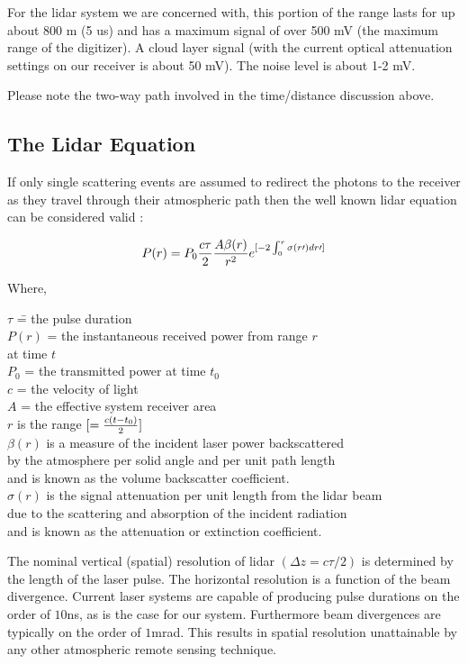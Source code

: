 For the lidar system we are concerned with, this portion of 
the range lasts for up about 800 m (5 us) and has a 
maximum signal of over 500 mV (the maximum range of the digitizer). A cloud 
layer signal (with the current optical attenuation settings on our receiver 
is about 50 mV). The noise level is about 1-2 mV.
 
Please note the two-way path involved in the time/distance discussion above.

\subsection{The Lidar Equation}

If only single scattering events are assumed to redirect the photons
to the receiver as they travel through their atmospheric path
then the well known lidar 
equation can be considered valid \cite{aic2}:
 
\begin{equation}
P(r)={P_0}{c\tau\over2}{A\beta (r)\over r^2}
e^{[-2\int_0^r{\sigma (r\prime)dr\prime}]} \label{lideq}
\end{equation}

\noindent
Where,
\noindent
\begin{tabbing}
$\tau$ \hspace{0.2in}\= = the pulse duration\\
$P(r)$ \>= the instantaneous received power from range $r$\\
\> at time $t$\\
$P_0$ \>= the transmitted power at time $t_0$\\
$c$ \>= the velocity of light\\
$A$ \>= the effective system receiver area\\
$r$ \>is the range $[={c(t-t_0)\over2}]$\\
$\beta(r)$  \>is a measure of the incident laser power backscattered\\
by the atmosphere per solid angle and per unit path length\\
and is known as the volume backscatter coefficient.\\
$\sigma(r)$ \> is the signal attenuation per unit length from the lidar beam\\ 
due to the scattering and absorption of the incident radiation\\ 
and is known as the attenuation or extinction coefficient.\\
\end{tabbing}
The nominal vertical (spatial) resolution of lidar $(\Delta z = c\tau/2)$
is determined by the length of the laser pulse.
The horizontal resolution is a function of the
beam divergence. Current laser systems are capable of producing
pulse durations on the order of $10$ns, as is the case for
our system. Furthermore beam divergences are typically on the
order of $1$mrad. This results in spatial resolution unattainable
by any other atmospheric remote sensing technique.

